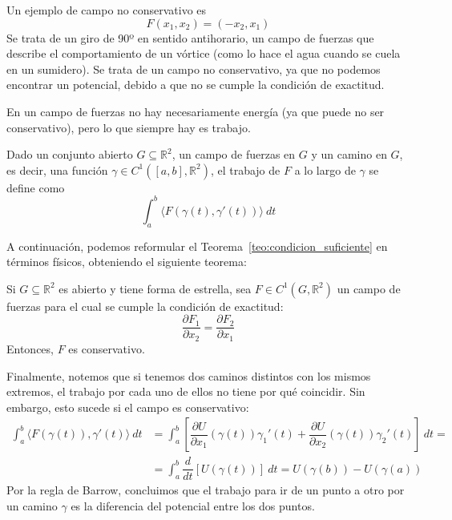 \begin{ejemplo}
    Un ejemplo de campo no conservativo es
    \begin{equation*}
        F(x_1,x_2) = (-x_2, x_1)
    \end{equation*}
    Se trata de un giro de 90º en sentido antihorario, un campo de fuerzas que describe el comportamiento de un vórtice (como lo hace el agua cuando se cuela en un sumidero). Se trata de un campo no conservativo, ya que no podemos encontrar un potencial, debido a que no se cumple la condición de exactitud.
\end{ejemplo}

En un campo de fuerzas no hay necesariamente energía (ya que puede no ser conservativo), pero lo que siempre hay es trabajo.

\begin{definicion}[Trabajo]
    Dado un conjunto abierto $G\subseteq \mathbb{R}^2$, un campo de fuerzas en $G$ y un camino en $G$, es decir, una función $\gamma\in C^1([a,b], \mathbb{R}^2)$, el trabajo de $F$ a lo largo de $\gamma$ se define como
    \begin{equation*}
        \int_{a}^{b} \langle F(\gamma(t), \gamma'(t)) \rangle~dt 
    \end{equation*}
\end{definicion}

A continuación, podemos reformular el Teorema~\ref{teo:condicion_suficiente} en términos físicos, obteniendo el siguiente teorema:

\begin{teo}
    Si $G\subseteq \mathbb{R}^2$ es abierto y tiene forma de estrella, sea $F\in C^1(G,\mathbb{R}^2)$ un campo de fuerzas para el cual se cumple la condición de exactitud:
    \begin{equation*}
        \dfrac{\partial F_1}{\partial x_2} = \dfrac{\partial F_2}{\partial x_1}
    \end{equation*}
    Entonces, $F$ es conservativo.
\end{teo}

Finalmente, notemos que si tenemos dos caminos distintos con los mismos extremos, el trabajo por cada uno de ellos no tiene por qué coincidir. Sin embargo, esto sucede si el campo es conservativo:
\begin{align*}
    \int_{a}^{b} \langle F(\gamma(t)), \gamma'(t) \rangle~dt  &= \int_{a}^{b} \left[\dfrac{\partial U}{\partial x_1}(\gamma(t))\gamma_1'(t) + \dfrac{\partial U}{\partial x_2}(\gamma(t))\gamma_2'(t)\right]~dt  = \\
                                                              &= \int_{a}^{b} \dfrac{d}{dt}[U(\gamma(t))]~dt = U(\gamma(b)) - U(\gamma(a))
\end{align*}
Por la regla de Barrow, concluimos que el trabajo para ir de un punto a otro por un camino $\gamma$ es la diferencia del potencial entre los dos puntos.\\

